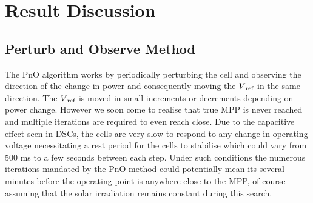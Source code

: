 \chapter{Result Discussion}
 
 \section{Perturb and Observe Method }
 
 The \ac{PnO} algorithm works by periodically perturbing the cell and observing the direction of the change in power and consequently moving the $V\textsubscript{ref}$ in the same direction. The $V\textsubscript{ref}$ is moved in small increments or decrements depending on power change.
 However we soon come to realise that true \ac{MPP} is never reached and multiple iterations are required to even reach close. Due to the capacitive effect seen in \ac{DSCs}, the cells are very slow to respond to any change in operating voltage necessitating a rest period for the cells to stabilise which could vary from 500 ms to a few seconds between each step. Under such conditions the numerous iterations mandated by the \ac{PnO} method could potentially mean its several minutes before the operating point is anywhere close to the \ac{MPP}, of course assuming that the solar irradiation remains constant during this search. 
 
